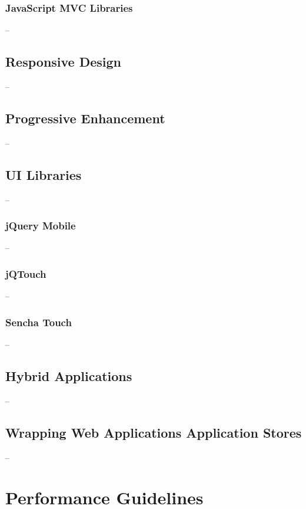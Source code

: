 \subsubsection{JavaScript MVC Libraries}

--

\subsection{Responsive Design}

--

\subsection{Progressive Enhancement}
\label{subsection:progressive-enhancement}

--

\subsection{UI Libraries}

--

\subsubsection{jQuery Mobile}

--

\subsubsection{jQTouch}

--

\subsubsection{Sencha Touch}

--

\subsection{Hybrid Applications}

--

\subsection{Wrapping Web Applications Application Stores}

--

\clearpage
\section{Performance Guidelines}
\label{section:performance-guidelines}

